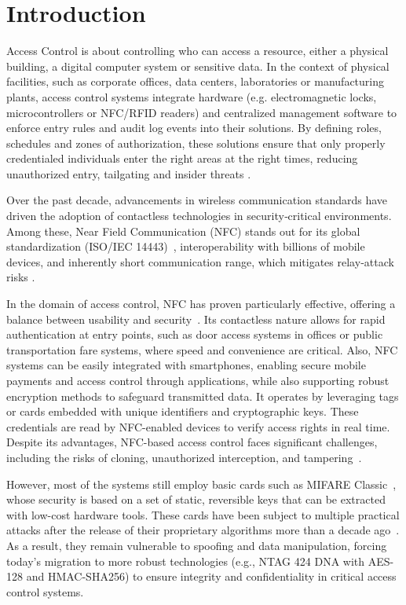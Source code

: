 \chapter{Introduction}
\label{chap:introduction}
Access Control is about controlling who can access a resource, either a physical building, a digital computer system or sensitive data. In the context of physical facilities, such as corporate offices, data centers, laboratories or manufacturing plants, access control systems integrate hardware (e.g. electromagnetic locks, microcontrollers or NFC/RFID readers) and centralized management software to enforce entry rules and audit log events into their solutions. By defining roles, schedules and zones of authorization, these solutions ensure that only properly credentialed individuals enter the right areas at the right times, reducing unauthorized entry, tailgating and insider threats \cite{Ref1}.

Over the past decade, advancements in wireless communication standards have driven the adoption of contactless technologies in security‑critical environments. Among these, Near Field Communication (NFC) stands out for its global standardization (ISO/IEC 14443)~\cite{Ref23}, interoperability with billions of mobile devices, and inherently short communication range, which mitigates relay‑attack risks \cite{Ref73}.

In the domain of access control, NFC has proven particularly effective, offering a balance between usability and security~\cite{Ref72}. Its contactless nature allows for rapid authentication at entry points, such as door access systems in offices or public transportation fare systems, where speed and convenience are critical. Also, NFC systems can be easily integrated with smartphones, enabling secure mobile payments and access control through applications, while also supporting robust encryption methods to safeguard transmitted data. It operates by leveraging tags or cards embedded with unique identifiers and cryptographic keys. These credentials are read by NFC-enabled devices to verify access rights in real time. Despite its advantages, NFC-based access control faces significant challenges, including the risks of cloning, unauthorized interception, and tampering~\cite{Ref2}.

However, most of the systems still employ basic cards such as MIFARE Classic~\cite{Ref28}, whose security is based on a set of static, reversible keys that can be extracted with low-cost hardware tools. These cards have been subject to multiple practical attacks after the release of their proprietary algorithms more than a decade ago~\cite{Ref79}. As a result, they remain vulnerable to spoofing and data manipulation, forcing today's migration to more robust technologies (e.g., NTAG 424 DNA with AES-128 and HMAC-SHA256) to ensure integrity and confidentiality in critical access control systems.

